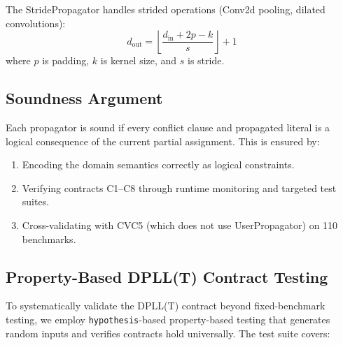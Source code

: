 \documentclass[11pt]{article}
\begin{document}
The StridePropagator handles strided operations (Conv2d pooling,
dilated convolutions):
\[
  d_{\text{out}} = \left\lfloor
    \frac{d_{\text{in}} + 2p - k}{s}
  \right\rfloor + 1
\]
where $p$ is padding, $k$ is kernel size, and $s$ is stride.

\subsection{Soundness Argument}

Each propagator is sound if every conflict clause and propagated
literal is a logical consequence of the current partial assignment.
This is ensured by:
\begin{enumerate}[leftmargin=2em]
  \item Encoding the domain semantics correctly as logical constraints.
  \item Verifying contracts C1--C8 through runtime monitoring
    and targeted test suites.
  \item Cross-validating with CVC5 (which does not use
    UserPropagator) on 110 benchmarks.
\end{enumerate}

\subsection{Property-Based DPLL(T) Contract Testing}

To systematically validate the DPLL(T) contract beyond fixed-benchmark
testing, we employ \texttt{hypothesis}-based property-based testing
that generates random inputs and verifies contracts hold universally.
The test suite covers:
\end{document}
